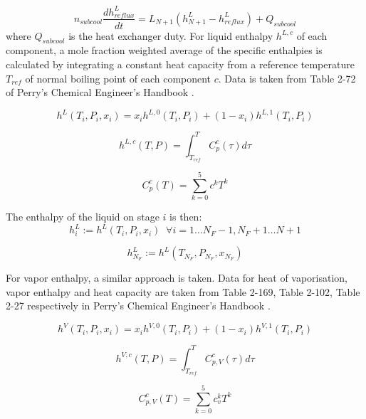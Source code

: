 \begin{equation}
    n_{subcool}\frac{d h^L_{reflux}}{dt} = L_{N+1}(h^L_{N+1} - h^L_{reflux}) + Q_{subcool}
\end{equation}
where $Q_{subcool}$ is the heat exchanger duty. For liquid enthalpy $h^{L,c}$ of each component, a mole fraction weighted average of the specific enthalpies is calculated by integrating a constant heat capacity from a reference temperature $T_{ref}$ of normal boiling point of each component $c$. Data is taken from Table 2-72 of Perry’s Chemical Engineer's Handbook \cite{Perrys2018}.

\begin{equation}
    h^L(T_i, P_i, x_i) = x_ih^{L,0}(T_i,P_i) + (1-x_i)h^{L,1}(T_i,P_i)
\end{equation}

\begin{equation}
    h^{L,c}(T,P) = \int_{T_{ref}}^T C_p^c(\tau)d\tau 
\end{equation}

\begin{equation}
    C_p^c(T) = \sum_{k=0}^5 c^kT^k 
\end{equation}

\noindent The enthalpy of the liquid on stage $i$ is then:
\begin{equation}
    h^L_i := h^L(T_i, P_i,x_i) \;\; \forall i = 1 \dots N_F-1, N_F+1 \dots N+1
\end{equation}

\begin{equation}
    h^L_{N_F} := h^L(T_{N_F}, P_{N_F},x_{N_F})
\end{equation}

\noindent For vapor enthalpy,  a similar approach is taken. Data for heat of vaporisation, vapor enthalpy and heat capacity are taken from Table 2-169, Table 2-102, Table 2-27 respectively in Perry’s Chemical Engineer's Handbook \cite{Perrys2018}.

\begin{equation}
    h^V(T_i, P_i, x_i) = x_i h^{V,0}(T_i,P_i) + (1-x_i) h^{V,1}(T_i,P_i)
\end{equation}

\begin{equation}
    h^{V,c}(T,P) = \int_{T_{ref}}^T C_{p,V}^c(\tau)d\tau 
\end{equation}

\begin{equation}
    C_{p,V}^c(T) = \sum_{k=0}^5 c_v^kT^k 
\end{equation}

